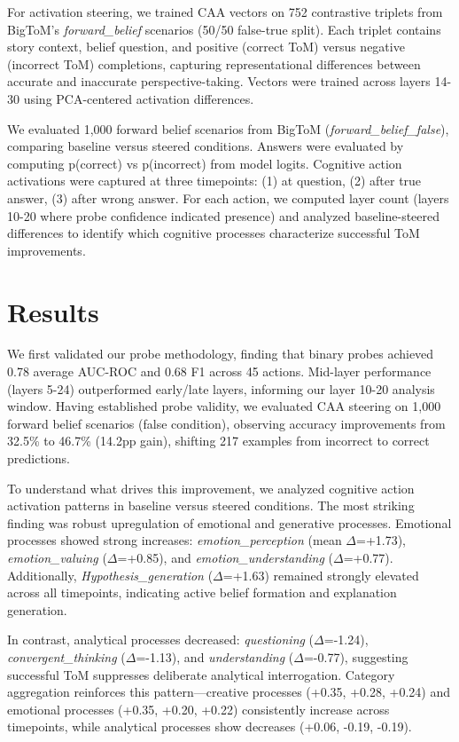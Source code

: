 \documentclass[letterpaper]{article}
\begin{document}
For activation steering, we trained CAA vectors \cite{rimsky2023steering,zou2023representation} on 752 contrastive triplets from BigToM's \cite{gandhi2023understanding} \textit{forward\_belief} scenarios (50/50 false-true split). Each triplet contains story context, belief question, and positive (correct ToM) versus negative (incorrect ToM) completions, capturing representational differences between accurate and inaccurate perspective-taking. Vectors were trained across layers 14-30 using PCA-centered activation differences.

We evaluated 1,000 forward belief scenarios from BigToM \cite{gandhi2023understanding} (\textit{forward\_belief\_false}), comparing baseline versus steered conditions. Answers were evaluated by computing p(correct) vs p(incorrect) from model logits. Cognitive action activations were captured at three timepoints: (1) at question, (2) after true answer, (3) after wrong answer. For each action, we computed layer count (layers 10-20 where probe confidence indicated presence) and analyzed baseline-steered differences to identify which cognitive processes characterize successful ToM improvements.

\section{Results}

We first validated our probe methodology, finding that binary probes achieved 0.78 average AUC-ROC and 0.68 F1 across 45 actions. Mid-layer performance (layers 5-24) outperformed early/late layers, informing our layer 10-20 analysis window. Having established probe validity, we evaluated CAA steering on 1,000 forward belief scenarios (false condition), observing accuracy improvements from 32.5\% to 46.7\% (14.2pp gain), shifting 217 examples from incorrect to correct predictions.

To understand what drives this improvement, we analyzed cognitive action activation patterns in baseline versus steered conditions. The most striking finding was robust upregulation of emotional and generative processes. Emotional processes showed strong increases: \textit{emotion\_perception} (mean $\Delta$=+1.73), \textit{emotion\_valuing} ($\Delta$=+0.85), and \textit{emotion\_understanding} ($\Delta$=+0.77). Additionally, \textit{Hypothesis\_generation} ($\Delta$=+1.63) remained strongly elevated across all timepoints, indicating active belief formation and explanation generation.

In contrast, analytical processes decreased: \textit{questioning} ($\Delta$=-1.24), \textit{convergent\_thinking} ($\Delta$=-1.13), and \textit{understanding} ($\Delta$=-0.77), suggesting successful ToM suppresses deliberate analytical interrogation. Category aggregation reinforces this pattern—creative processes (+0.35, +0.28, +0.24) and emotional processes (+0.35, +0.20, +0.22) consistently increase across timepoints, while analytical processes show decreases (+0.06, -0.19, -0.19).
\end{document}
